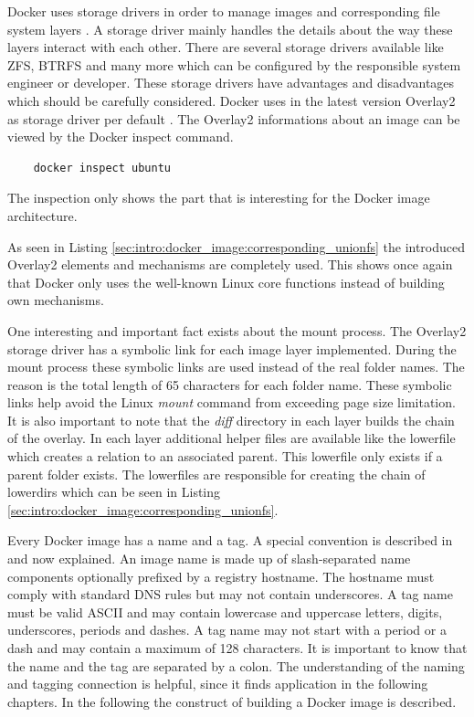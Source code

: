 Docker uses storage drivers in order to manage images and corresponding file system layers \cite{docker_storage_driver}. 
A storage driver mainly handles the details about the way these layers interact with each other.
There are several storage drivers available like ZFS, BTRFS and many more which can be configured by the responsible system engineer or developer. 
These storage drivers have advantages and disadvantages which should be carefully considered. 
Docker uses in the latest version Overlay2 as storage driver per default \cite{docker_storage_driver}. 
The Overlay2 informations about an image can be viewed by the Docker inspect command.
\begin{lstlisting}
	docker inspect ubuntu
\end{lstlisting}
The inspection only shows the part that is interesting for the Docker image architecture.

As seen in Listing \ref{sec:intro:docker_image:corresponding_unionfs} the introduced Overlay2 elements and mechanisms are completely used.
This shows once again that Docker only uses the well-known Linux core functions instead of building own mechanisms.

One interesting and important fact exists about the mount process.
The Overlay2 storage driver has a symbolic link for each image layer implemented. 
During the mount process these symbolic links are used instead of the real folder names. 
The reason is the total length of 65 characters for each folder name. 
These symbolic links help avoid the Linux \textit{mount} command from exceeding page size limitation.
It is also important to note that the \textit{diff} directory in each layer builds the chain of the overlay. 
In each layer additional helper files are available like the lowerfile which creates a relation to an associated parent. 
This lowerfile only exists if a parent folder exists. 
The lowerfiles are responsible for creating the chain of lowerdirs which can be seen in Listing \ref{sec:intro:docker_image:corresponding_unionfs}.

Every Docker image has a name and a tag. A special convention is described in \cite{docker_tag} and now explained. 
An image name is made up of slash-separated name components optionally prefixed by a registry hostname. 
The hostname must comply with standard DNS rules but may not contain underscores. 
A tag name must be valid ASCII and may contain lowercase and uppercase letters, digits, underscores, periods and dashes. 
A tag name may not start with a period or a dash and may contain a maximum of 128 characters.
It is important to know that the name and the tag are separated by a colon.
The understanding of the naming and tagging connection is helpful, since it finds application in the following chapters.
In the following the construct of building a Docker image is described.

